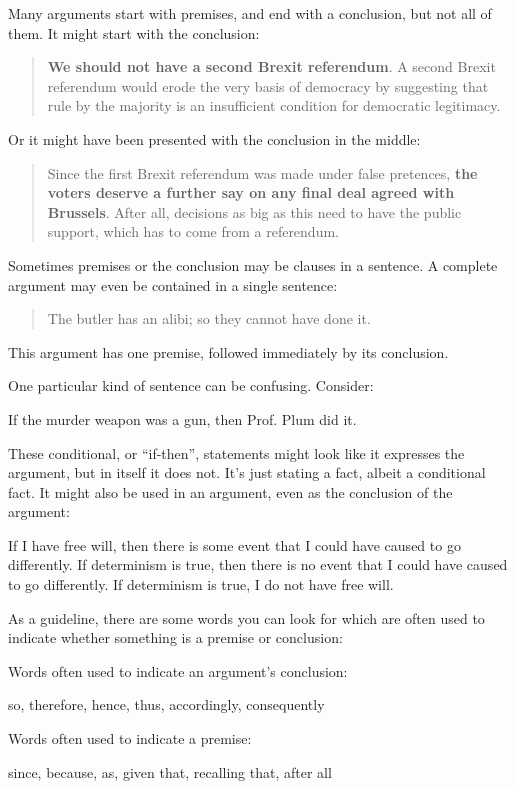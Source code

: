 Many arguments start with premises, and end with a conclusion, but not all of them. It might start with the conclusion:
	\begin{quote}\textbf{We should not have a second Brexit referendum}.
		A second Brexit referendum would erode the very basis of
		democracy by suggesting that rule by the majority is an insufficient
		condition for democratic legitimacy. 
	\end{quote}
Or it might have been presented with the conclusion in the middle:
	\begin{quote}
		Since the first Brexit referendum was made under false pretences,
		\textbf{the voters deserve a further say on any final deal agreed with
		Brussels}. After all, decisions as big as this need to have the public
		support, which has to come from a referendum.
	\end{quote}


Sometimes premises or the conclusion may be clauses in a sentence. 
A complete argument may even be contained in a single sentence:
\begin{quote}
The butler has an alibi; so they cannot have done it.
\end{quote}
This argument has one premise, followed immediately by its conclusion. 

One particular kind of sentence can be confusing. Consider: 
\begin{ebullet}
\item  If the murder weapon was a gun, then Prof. Plum did it.
\end{ebullet}
These conditional, or ``if-then'', statements might look like it expresses the argument, but in itself it does not. It's just stating a fact, albeit a conditional fact. It might also be used in an argument, even as the conclusion of the argument:
	\begin{earg}
	\prem  If I have free will, then there is some event that I could have caused to go differently.
	\prem  If determinism is true, then there is no event that I could have caused to go differently.
	\conc If determinism is true, I do not have free will. 
	\end{earg}

As a guideline, there are some words you can look for which are often used to indicate whether something is a premise or conclusion:	
	\begin{highlighted}
	Words often used to indicate an argument's conclusion:
		\begin{center}
			so, therefore, hence, thus, accordingly, consequently
		\end{center}
	Words often used to indicate a premise:
		\begin{center}
			since, because, as, given that, recalling that, after all
		\end{center}
	\end{highlighted}



